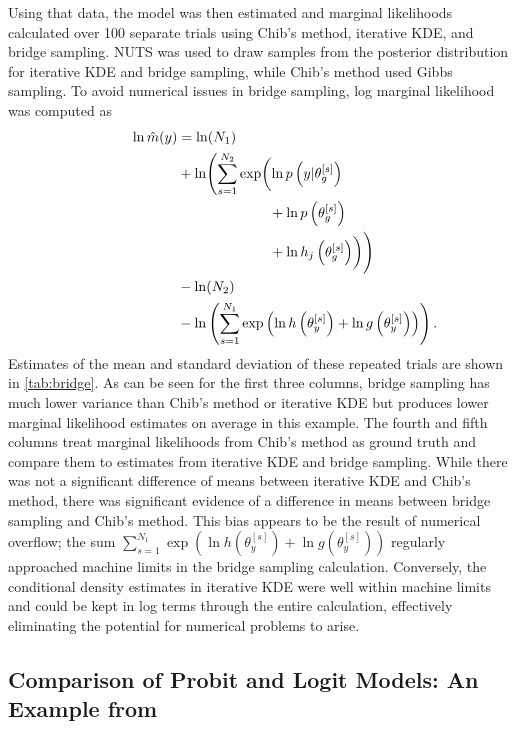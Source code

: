 \documentclass[twocolumn]{article}
\begin{document}
Using that data, the model was then estimated and marginal likelihoods calculated over 100 separate trials using Chib's method, iterative KDE, and bridge sampling. NUTS was used to draw samples from the posterior distribution for iterative KDE and bridge sampling, while Chib's method used Gibbs sampling. To avoid numerical issues in bridge sampling, log marginal likelihood was computed as
\begin{align*}
\label{eq:bridgeCalculation}
\ln\hat{m}(y) &= \ln(N_1)\\
&+ \ln\Biggl(\sum_{s=1}^{N_2} \exp\biggl(&&\hspace*{-13em}\ln p\left(y|\theta_{g}^{[s]}\right) \\& &&\hspace*{-13em}+ \ln p\left(\theta_{g}^{[s]}\right) \\& &&\hspace*{-13em} + \ln h_j\left(\theta_{g}^{[s]}\right)\biggr)\Biggr)\\
&- \ln(N_2)\\
&- \ln\left(\sum_{s=1}^{N_1} \exp\left(\ln h\left(\theta_{y}^{[s]}\right) + \ln g\left(\theta_{y}^{[s]}\right)\right)\right).
\end{align*}
Estimates of the mean and standard deviation of these repeated trials are shown in \cref{tab:bridge}. As can be seen for the first three columns, bridge sampling has much lower variance than Chib's method or iterative KDE but produces lower marginal likelihood estimates on average in this example. The fourth and fifth columns treat marginal likelihoods from Chib's method as ground truth and compare them to estimates from iterative KDE and bridge sampling. While there was not a significant difference of means between iterative KDE and Chib's method, there was significant evidence of a difference in means between bridge sampling and Chib's method. This bias appears to be the result of numerical overflow; the sum $\sum_{s=1}^{N_1} \exp\left(\ln h\left(\theta_{y}^{[s]}\right) + \ln g\left(\theta_{y}^{[s]}\right)\right)$ regularly approached machine limits in the bridge sampling calculation. Conversely, the conditional density estimates in iterative KDE were well within machine limits and could be kept in log terms through the entire calculation, effectively eliminating the potential for numerical problems to arise.

\subsection{Comparison of Probit and Logit Models: An Example from \cite{Chib}}
\end{document}
